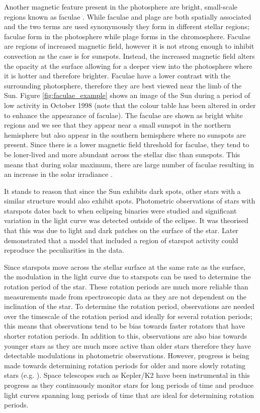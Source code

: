 Another magnetic feature present in the photosphere are bright, small-scale regions known as faculae \citep{Hale_1922}. While faculae and plage are both spatially associated and the two terms are used synonymously they form in different stellar regions; faculae form in the photosphere while plage forms in the chromosphere. Faculae are regions of increased magnetic field, however it is not strong enough to inhibit convection as the case is for sunspots. Instead, the increased magnetic field alters the opacity at the surface allowing for a deeper view into the photosphere where it is hotter and therefore brighter. Faculae have a lower contrast with the surrounding photosphere, therefore they are best viewed near the limb of the Sun. Figure \ref{fig:faculae_example} shows an image of the Sun during a period of low activity in October 1998 (note that the colour table has been altered in order to enhance the appearance of faculae). The faculae are shown as bright white regions and we see that they appear near a small sunspot in the northern hemisphere but also appear in the southern hemisphere where no sunspots are present. Since there is a lower magnetic field threshold for faculae, they tend to be loner-lived and more abundant across the stellar disc than sunspots. This means that during solar maximum, there are large number of faculae resulting in an increase in the solar irradiance \citep{Walton_etal_2003}.

It stands to reason that since the Sun exhibits dark spots, other stars with a similar structure would also exhibit spots. Photometric observations of stars with starspots dates back to \citet{Kron_1947} when eclipsing binaries were studied and significant variation in the light curve was detected outside of the eclipse. It was theorised that this was due to light and dark patches on the surface of the star. Later \citet{Hall_1972} demonstrated that a model that included a region of starspot activity could reproduce the peculiarities in the data.

Since starspots move across the stellar surface at the same rate as the surface, the modulation in the light curve due to starspots can be used to determine the rotation period of the star. These rotation periods are much more reliable than measurements made from spectroscopic data as they are not dependent on the inclination of the star. To determine the rotation period, observations are needed over the timescale of the rotation period and ideally for several rotation periods; this means that observations tend to be bias towards faster rotators that have shorter rotation periods. In addition to this, observations are also bias towards younger stars as they are much more active than older stars therefore they have detectable modulations in photometric observations. However, progress is being made towards determining rotation periods for older and more slowly rotating stars (e.g. \citealt{Barnes_etal_2016,Douglas_etal_2016,Lanzafame_etal_2018}). Space telescopes such as Kepler/K2 have been instrumental in this progress as they continuously monitor stars for long periods of time and produce light curves spanning long periods of time that are ideal for determining rotation periods.

